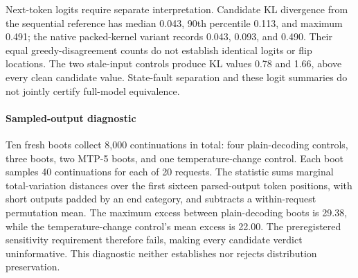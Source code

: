 Next-token logits require separate interpretation. Candidate KL divergence from the sequential reference has median 0.043, 90th percentile 0.113, and maximum 0.491; the native packed-kernel variant records 0.043, 0.093, and 0.490. Their equal greedy-disagreement counts do not establish identical logits or flip locations. The two stale-input controls produce KL values 0.78 and 1.66, above every clean candidate value. State-fault separation and these logit summaries do not jointly certify full-model equivalence.

\paragraph{Sampled-output diagnostic}
Ten fresh boots collect 8,000 continuations in total: four plain-decoding controls, three \sys{} boots, two MTP-5 boots, and one temperature-change control. Each boot samples 40 continuations for each of 20 requests. The statistic sums marginal total-variation distances over the first sixteen parsed-output token positions, with short outputs padded by an end category, and subtracts a within-request permutation mean. The maximum excess between plain-decoding boots is 29.38, while the temperature-change control's mean excess is 22.00. The preregistered sensitivity requirement therefore fails, making every candidate verdict uninformative. This diagnostic neither establishes nor rejects distribution preservation.
